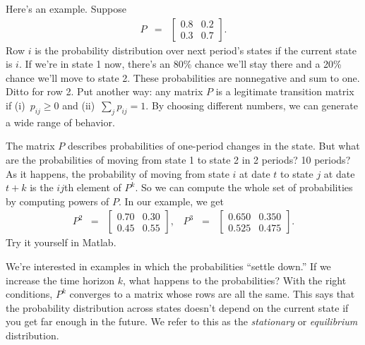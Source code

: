 \documentclass[11pt]{article}
\begin{document}
Here's an example.  Suppose
\begin{eqnarray*}
    P &=& \left[
            \begin{array}{cc}
            0.8 & 0.2 \\  0.3 & 0.7
            \end{array}
            \right] .
\end{eqnarray*}
Row $i$ is the probability distribution over next period's states
if the current state is $i$.
If we're in state 1 now, there's an 80\% chance we'll stay there
and a 20\% chance we'll move to state 2.
These probabilities are nonnegative and sum to one.
Ditto for row 2.
Put another way:  any matrix $P$ is a legitimate transition matrix
if (i)~$p_{ij} \geq 0$ and (ii)~$\sum_j p_{ij} = 1$.
By choosing different numbers, we can generate a wide range of behavior.


The matrix $P$ describes probabilities of one-period changes in the state.
But what are the probabilities of moving from state 1 to state 2 in 2 periods?
10 periods?
As it happens, the probability of moving from state $i$ at date $t$ to state $j$
at date $t+k$ is the $ij$th element of $P^k$.
So we can compute the whole set of probabilities by computing powers of $P$.
In our example, we get
\begin{eqnarray*}
    P^2 &=& \left[
            \begin{array}{cc}
            0.70 & 0.30 \\  0.45 & 0.55
            \end{array}
            \right] , \;\;\;
    P^3 \;\;=\;\; \left[
            \begin{array}{cc}
            0.650 & 0.350 \\  0.525 & 0.475
            \end{array}
            \right] .
\end{eqnarray*}
Try it yourself in Matlab.


We're interested in examples in which the probabilities ``settle down.''
If we increase the time horizon $k$, what happens to the probabilities?
With the right conditions,
$P^k$ converges to a matrix whose rows are all the same.
This says that the probability distribution across states doesn't depend
on the current state if you get far enough in the future.
We refer to this as the {\it stationary\/} or {\it equilibrium\/} distribution.
\end{document}
